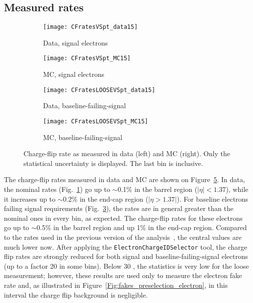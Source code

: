 \subsection{Measured rates}
\label{subsec:chargeflip_rates}

\begin{figure}[t!]
\centering
\begin{subfigure}[b]{0.45\textwidth}
	\texttt{[image: CFratesVSpt\_data15]}
	\caption{Data, signal electrons}\label{fig:Chflip_nominalData}
\end{subfigure}
\begin{subfigure}[b]{0.45\textwidth}
	\texttt{[image: CFratesVSpt\_MC15]}
	\caption{MC, signal electrons}\label{fig:Chflip_nominalMC}
\end{subfigure}
\begin{subfigure}[b]{0.45\textwidth}
	\texttt{[image: CFratesLOOSEVSpt\_data15]}
	\caption{Data, baseline-failing-signal}\label{fig:Chflip_looseData}
\end{subfigure}
\begin{subfigure}[b]{0.45\textwidth}
	\texttt{[image: CFratesLOOSEVSpt\_MC15]}
	\caption{MC, baseline-failing-signal}\label{fig:Chflip_looseMC}
\end{subfigure}
\caption{Charge-flip rate as measured in data (left) and MC (right). 
Only the statistical uncertainty is displayed. The last \pt bin is inclusive.}
\label{fig:ChFlip_Rate}
\end{figure}

The charge-flip rates measured in data and MC are shown on Figure~\ref{fig:ChFlip_Rate}. 
 In data, the nominal rates (Fig.~\ref{fig:Chflip_nominalData}) go up to $\sim$0.1\% in the barrel region ($|\eta| < 1.37$), 
 while it increases up to $\sim$0.2\% in the end-cap region ($|\eta > 1.37|$). 
 For baseline electrons failing signal requirements (Fig.~\ref{fig:Chflip_looseData}), 
 the rates are in general greater than the nominal ones in every bin, as expected. The charge-flip rates for these electrons go up to $\sim$0.5\% in the barrel region and up 1\% in the end-cap region. Compared to the rates used in the previous version of the analysis~\cite{ATLAS-CONF-2016-037}, the central values are much lower now. After applying the \texttt{ElectronChargeIDSelector} tool, the charge flip rates are strongly reduced for both signal and baseline-failing-signal electrons (up to a factor 20 in some bins). Below 30 \GeV, the statistics is very low for the loose measurement; however, these results are used only to measure the electron fake rate and, as illustrated in Figure~\ref{Fig:fakes_preselection_electron}, in this \pt interval the charge flip background is negligible.

